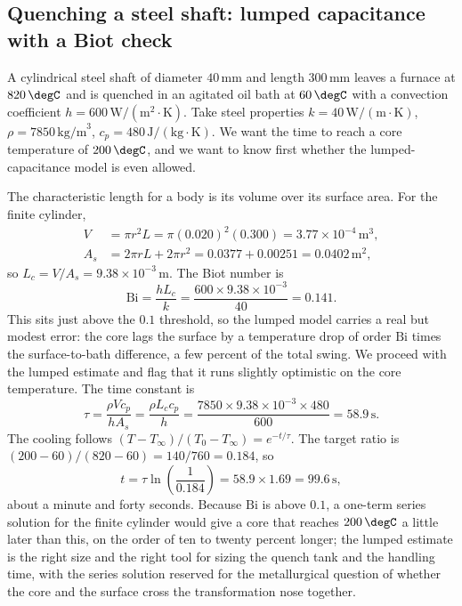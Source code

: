 \subsection{Quenching a steel shaft: lumped capacitance with a Biot
check}

A cylindrical steel shaft of diameter $40\,\si{\milli\meter}$ and
length $300\,\si{\milli\meter}$ leaves a furnace at $820\,\degC$ and is
quenched in an agitated oil bath at $60\,\degC$ with a convection
coefficient $h = 600\,\text{W}/(\text{m}^2\cdot\si{\kelvin})$. Take
steel properties $k = 40\,\text{W}/(\text{m}\cdot\si{\kelvin})$, $\rho =
7850\,\text{kg/m}^3$, $c_p = 480\,\text{J}/(\text{kg}\cdot\si{\kelvin})$.
We want the time to reach a core temperature of $200\,\degC$, and we
want to know first whether the lumped-capacitance model is even allowed.

The characteristic length for a body is its volume over its surface
area. For the finite cylinder,
\begin{align*}
V &= \pi r^2 L = \pi (0.020)^2 (0.300) = 3.77 \times 10^{-4}\,\text{m}^3,
\\
A_s &= 2\pi r L + 2\pi r^2 = 0.0377 + 0.00251 = 0.0402\,\text{m}^2,
\end{align*}
so $L_c = V/A_s = 9.38 \times 10^{-3}\,\text{m}$. The Biot number is
\[
\text{Bi} = \frac{h L_c}{k} = \frac{600 \times 9.38 \times 10^{-3}}{40}
= 0.141.
\]
This sits just above the $0.1$ threshold, so the lumped model carries a
real but modest error: the core lags the surface by a temperature drop
of order $\text{Bi}$ times the surface-to-bath difference, a few percent
of the total swing. We proceed with the lumped estimate and flag that it
runs slightly optimistic on the core temperature. The time constant is
\[
\tau = \frac{\rho V c_p}{h A_s} = \frac{\rho L_c c_p}{h} =
\frac{7850 \times 9.38 \times 10^{-3} \times 480}{600} = 58.9\,\text{s}.
\]
The cooling follows $(T - T_\infty)/(T_0 - T_\infty) = e^{-t/\tau}$. The
target ratio is $(200 - 60)/(820 - 60) = 140/760 = 0.184$, so
\[
t = \tau \ln\!\left(\frac{1}{0.184}\right) = 58.9 \times 1.69 =
99.6\,\text{s},
\]
about a minute and forty seconds. Because $\text{Bi}$ is above $0.1$, a
one-term series solution for the finite cylinder would give a core that
reaches $200\,\degC$ a little later than this, on the order of ten to
twenty percent longer; the lumped estimate is the right size and the
right tool for sizing the quench tank and the handling time, with the
series solution reserved for the metallurgical question of whether the
core and the surface cross the transformation nose together.

